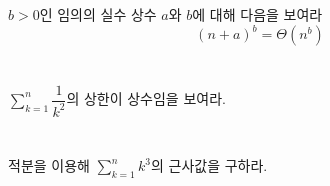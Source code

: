 \documentclass{oblivoir}
\begin{document}
\section{} 
$b>0$인 임의의 실수 상수 $a$와 $b$에 대해 다음을 보여라
$$(n+a)^b = \Theta(n^b)$$


\section{} 
$\displaystyle\sum_{k=1}^n \dfrac{1}{k^2}$의 상한이 상수임을 보여라.


\section{} 
적분을 이용해 $\displaystyle\sum_{k=1}^n k^3$의 근사값을 구하라.
\end{document}
